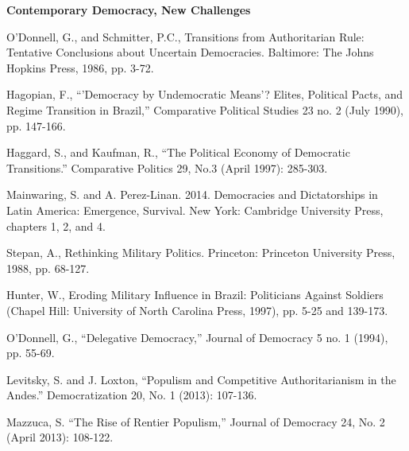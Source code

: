 \documentclass[letterpaper]{article}
\renewenvironment{itemize}{
  \begin{list}{}{
    \setlength{\leftmargin}{1.5em}
  }
}{
  \end{list}
}
\begin{document}
\begin{enumerate}
\item {\bf Contemporary Democracy, New Challenges}
	\begin{itemize}
		\item[$\bullet$] O'Donnell, G., and Schmitter, P.C., Transitions from Authoritarian Rule: Tentative Conclusions about Uncertain Democracies. Baltimore: The Johns Hopkins Press, 1986, pp. 3-72.
		\item[$\bullet$] Hagopian, F., ``'Democracy by Undemocratic Means'? Elites, Political Pacts, and Regime Transition in Brazil,'' Comparative Political Studies 23 no. 2 (July 1990), pp. 147-166.
		\item[$\bullet$] Haggard, S., and Kaufman, R., ``The Political Economy of Democratic Transitions.'' Comparative Politics 29, No.3 (April 1997): 285-303.		
		\item[$\bullet$] Mainwaring, S. and A. Perez-Linan. 2014. Democracies and Dictatorships in Latin America: Emergence, Survival. New York: Cambridge University Press, chapters 1, 2, and 4.
		\item[$\bullet$] Stepan, A., Rethinking Military Politics. Princeton: Princeton University Press, 1988, pp. 68-127.
		\item[$\bullet$] Hunter, W., Eroding Military Influence in Brazil: Politicians Against Soldiers (Chapel Hill: University of North Carolina Press, 1997), pp. 5-25 and 139-173.
		\item[$\bullet$] O'Donnell, G., ``Delegative Democracy,'' Journal of Democracy 5 no. 1 (1994), pp. 55-69.
		\item[$\bullet$] Levitsky, S. and J. Loxton, ``Populism and Competitive Authoritarianism in the Andes.'' Democratization 20, No. 1 (2013): 107-136.
		\item[$\bullet$] Mazzuca, S. ``The Rise of Rentier Populism,'' Journal of Democracy 24, No. 2 (April 2013): 108-122.
	\end{itemize}



\end{enumerate}
\end{document}
